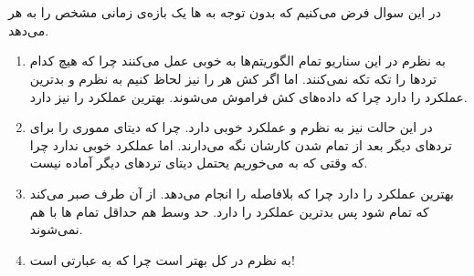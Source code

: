 \section{}
در این سوال فرض می‌کنیم که
بدون توجه به
ها
یک بازه‌ی زمانی مشخص را به هر
می‌دهد.
\begin{enumerate}
    \item به نظرم در این سناریو تمام الگوریتم‌ها به خوبی عمل می‌کنند چرا که هیچ کدام ترد‌ها را تکه تکه نمی‌کنند.
    اما اگر کش هر
    را نیز لحاظ کنیم به نظرم
     و 
    بدترین عملکرد را دارد چرا که داده‌های کش فراموش می‌شوند. بهترین عملکرد را نیز
    دارد.
    \item در این حالت نیز به نظرم
     و 
    عملکرد خوبی دارد. چرا که دیتای مموری را برای ترد‌های دیگر بعد از تمام شدن کارشان نگه می‌دارند.
    اما
    عملکرد خوبی ندارد چرا که وقتی که به
    می‌خوریم یحتمل دیتای ترد‌های دیگر آماده نیست.
    \item {} بهترین عملکرد را دارد چرا که بلافاصله 
    را انجام می‌دهد. از آن طرف
    صبر می‌کند که  تمام شود پس بدترین عملکرد را دارد. حد وسط هم
     حداقل تمام ها
    با هم
    نمی‌شوند.
    \item به نظرم در کل  بهتر است چرا که به عبارتی
    است!
\end{enumerate}